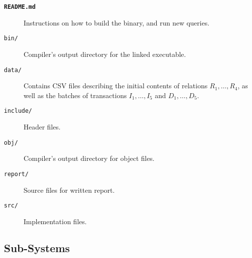 \begin{description}
  \item[\textnormal{\textbf{\texttt{README.md}}}] Instructions on how to build the binary, and run new queries.
  \item[\textnormal{\texttt{bin/}}] Compiler's output directory for the linked executable.
  \item[\textnormal{\texttt{data/}}] Contains CSV files describing the initial contents of relations $R_1,\ldots,R_4$, as well as the batches of transactions $I_1,\ldots,I_5$ and $D_1,\ldots,D_5$.
  \item[\textnormal{\texttt{include/}}] Header files.
  \item[\textnormal{\texttt{obj/}}] Compiler's output directory for object files.
  \item[\textnormal{\texttt{report/}}] Source files for written report.
  \item[\textnormal{\texttt{src/}}] Implementation files.
\end{description}

\subsection{Sub-Systems}\label{sec:q-2-class}

